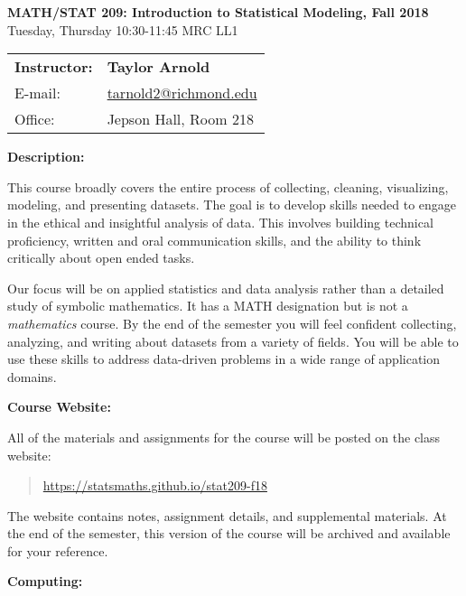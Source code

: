 \documentclass[12pt]{article}
\begin{document}
\begin{center}
{\bf MATH/STAT 209: Introduction to Statistical Modeling, Fall 2018} \\
Tuesday, Thursday 10:30-11:45 \quad MRC LL1\\
\end{center}

\bigskip

\noindent
\begin{tabular}{ l l }
{\bf Instructor:} &  {\bf Taylor Arnold} \\
E-mail: & \href{mailto:tarnold2@richmond.edu}{tarnold2@richmond.edu} \\
Office: & Jepson Hall, Room 218
\end{tabular}

\vspace{0.5cm}

\textbf{Description:} \vspace{6pt}

This course broadly covers the entire process of collecting,
cleaning, visualizing, modeling, and presenting datasets. The goal is to
develop skills needed to engage in the ethical and insightful analysis of
data. This involves building technical proficiency, written and oral
communication skills, and the ability to think critically about open ended
tasks.

\medskip

Our focus will be on applied statistics and data analysis rather than a
detailed study of symbolic mathematics. It has a MATH designation but is not
a \textit{mathematics} course. By the end of the semester you will
feel confident collecting, analyzing, and writing about datasets
from a variety of fields. You will be able to use these skills to
address data-driven problems in a wide range of application domains.

\bigskip

\textbf{Course Website:} \vspace{6pt}

All of the materials and assignments for the course will be posted
on the class website:
\begin{quote}
\url{https://statsmaths.github.io/stat209-f18}
\end{quote}
The website contains notes, assignment details, and
supplemental materials. At the end of the semester, this version of
the course will be archived and available for your reference.

\bigskip

\textbf{Computing:} \vspace{6pt}
\end{document}
